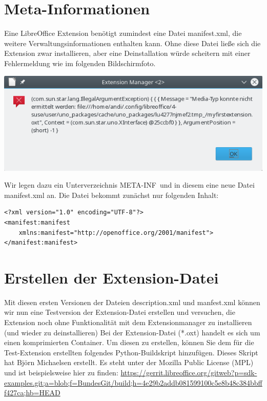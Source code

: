 \documentclass[a4paper,10pt,pagesize,titlepage]{scrbook}
\begin{document}
\section{Meta-Informationen}

Eine LibreOffice Extension benötigt zumindest eine Datei manifest.xml, die weitere Verwaltungsinformationen enthalten kann. Ohne diese Datei ließe sich die Extension zwar installieren, aber eine Deinstallation würde scheitern mit einer Fehlermeldung wie im folgenden Bildschirmfoto.
\begin{center}
\includegraphics[width=0.7\linewidth]{pics/error_deinstallation_missing_manifest}
\label{fig:error_deinstallation_missing_manifest}
\end{center}

Wir legen dazu ein Unterverzeichnis \glqq META-INF\grqq~und in diesem eine neue Datei manifest.xml an. Die Datei bekommt zunächst nur folgenden Inhalt:
\begin{lstlisting}
<?xml version="1.0" encoding="UTF-8"?>
<manifest:manifest 
    xmlns:manifest="http://openoffice.org/2001/manifest">
</manifest:manifest>
\end{lstlisting}



\section{Erstellen der Extension-Datei}

Mit diesen ersten Versionen der Dateien description.xml und manfest.xml können wir nun eine Testversion der Extension-Datei erstellen und versuchen, die Extension noch ohne Funktionalität mit dem Extensionmanager zu installieren (und wieder zu deinstallieren)
Bei der Extension-Datei (*.oxt) handelt es sich um einen komprimierten Container. Um diesen zu erstellen, können Sie dem für die Test-Extension erstellten folgendes Python-Buildskript hinzufügen. Dieses Skript hat Björn Michaelsen erstellt. Es steht unter der Mozilla Public License (MPL) und ist beispielsweise hier zu finden: \url{https://gerrit.libreoffice.org/gitweb?p=sdk-examples.git;a=blob;f=BundesGit/build;h=4e29b2addb081599100c5e8b48c384bbfff427ca;hb=HEAD}
\end{document}
